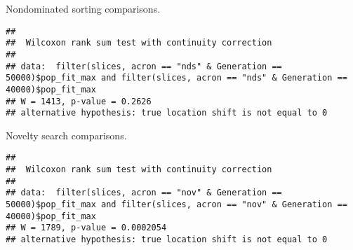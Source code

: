 \documentclass[]{book}
\newenvironment{Shaded}{\begin{snugshade}}{\end{snugshade}}
\newcommand{\DataTypeTok}[1]{\textcolor[rgb]{0.13,0.29,0.53}{#1}}
\newcommand{\DecValTok}[1]{\textcolor[rgb]{0.00,0.00,0.81}{#1}}
\newcommand{\KeywordTok}[1]{\textcolor[rgb]{0.13,0.29,0.53}{\textbf{#1}}}
\newcommand{\NormalTok}[1]{#1}
\newcommand{\OperatorTok}[1]{\textcolor[rgb]{0.81,0.36,0.00}{\textbf{#1}}}
\newcommand{\StringTok}[1]{\textcolor[rgb]{0.31,0.60,0.02}{#1}}
\begin{document}
Nondominated sorting comparisons.

\begin{Shaded}
\end{Shaded}

\begin{verbatim}
## 
##  Wilcoxon rank sum test with continuity correction
## 
## data:  filter(slices, acron == "nds" & Generation == 50000)$pop_fit_max and filter(slices, acron == "nds" & Generation == 40000)$pop_fit_max
## W = 1413, p-value = 0.2626
## alternative hypothesis: true location shift is not equal to 0
\end{verbatim}

Novelty search comparisons.

\begin{Shaded}
\end{Shaded}

\begin{verbatim}
## 
##  Wilcoxon rank sum test with continuity correction
## 
## data:  filter(slices, acron == "nov" & Generation == 50000)$pop_fit_max and filter(slices, acron == "nov" & Generation == 40000)$pop_fit_max
## W = 1789, p-value = 0.0002054
## alternative hypothesis: true location shift is not equal to 0
\end{verbatim}


\end{document}
